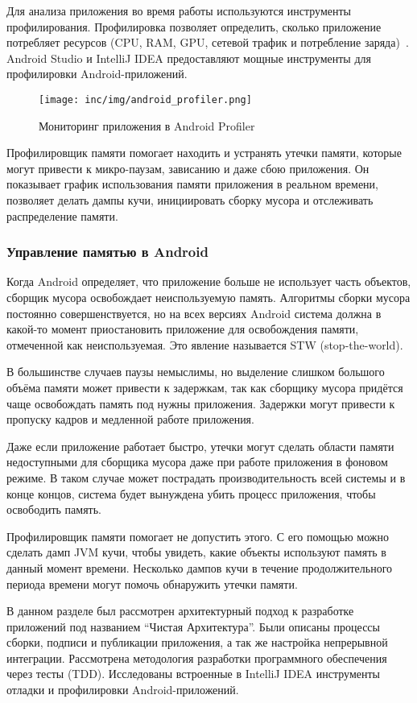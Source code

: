 Для анализа приложения во время работы используются инструменты профилирования.
Профилировка позволяет определить, сколько приложение потребляет ресурсов (CPU, RAM, GPU, сетевой трафик и потребление заряда)~\cite{android:profile}.
Android Studio и IntelliJ IDEA предоставляют мощные инструменты для профилировки Android-приложений.

\begin{figure}[ht]
  \texttt{[image: inc/img/android\_profiler.png]}
  \caption{Мониторинг приложения в Android Profiler}
  \label{fig:profiler}
\end{figure}

Профилировщик памяти помогает находить и устранять утечки памяти, которые могут привести к микро-паузам, зависанию и даже сбою приложения.
Он показывает график использования памяти приложения в реальном времени, позволяет делать дампы кучи, инициировать сборку мусора и отслеживать распределение памяти.

\subsubsection*{Управление памятью в Android}

Когда Android определяет, что приложение больше не использует часть объектов, сборщик мусора освобождает неиспользуемую память.
Алгоритмы сборки мусора постоянно совершенствуется, но на всех версиях Android система должна в какой-то момент приостановить приложение для освобождения памяти, отмеченной как неиспользуемая.
Это явление называется STW (stop-the-world).

В большинстве случаев паузы немыслимы, но выделение слишком большого объёма памяти может привести к задержкам, так как сборщику мусора придётся чаще освобождать память под нужны приложения.
Задержки могут привести к пропуску кадров и медленной работе приложения.

Даже если приложение работает быстро, утечки могут сделать области памяти недоступными для сборщика мусора даже при работе приложения в фоновом режиме.
В таком случае может пострадать производительность всей системы и в конце концов, система будет вынуждена убить процесс приложения, чтобы освободить память.

Профилировщик памяти помогает не допустить этого.
С его помощью можно сделать дамп JVM кучи, чтобы увидеть, какие объекты используют память в данный момент времени.
Несколько дампов кучи в течение продолжительного периода времени могут помочь обнаружить утечки памяти.

\conclusions
\label{sec:techConclusions}

В данном разделе был рассмотрен архитектурный подход к разработке приложений под названием ``Чистая Архитектура''.
Были описаны процессы сборки, подписи и публикации приложения, а так же настройка непрерывной интеграции.
Рассмотрена методология разработки программного обеспечения через тесты (TDD).
Исследованы встроенные в IntelliJ IDEA инструменты отладки и профилировки Android-приложений.
